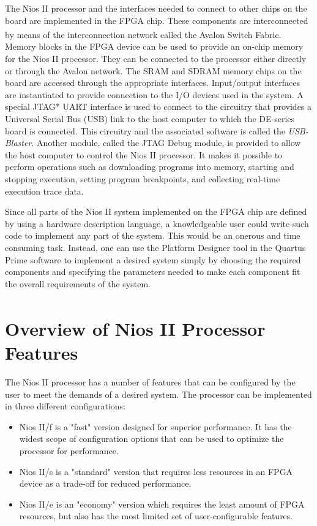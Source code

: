 \documentclass[11pt, twoside, pdftex]{article}
\begin{document}
\newpage
The Nios II processor and the interfaces needed to connect to other chips on the
board are implemented in the FPGA chip. These components are
interconnected by means of the interconnection network called the Avalon\textsuperscript{\textregistered} Switch Fabric.
Memory blocks in the FPGA device can be used to provide an on-chip memory
for the Nios II processor. They can be connected to the processor either directly or
through the Avalon network. The SRAM and SDRAM memory chips on the board
are accessed through the appropriate interfaces. Input/output interfaces are
instantiated to provide connection to the I/O devices used in the system. 
A special JTAG* UART interface is used to connect to the circuitry that provides a 
Universal Serial Bus (USB) link to the host computer to which the DE-series board is connected. 
This circuitry and the associated software is called the {\it USB-Blaster}. 
Another module, called the JTAG Debug module, is provided to allow the host computer 
to control the Nios II processor.
It makes it possible to perform operations such as downloading programs into memory,
starting and stopping execution, setting program breakpoints, and collecting real-time
execution trace data.

Since all parts of the Nios II system implemented on the FPGA chip are defined by
using a hardware description language, a knowledgeable user could write such code
to implement any part of the system. This would be an onerous and time consuming
task. Instead, one can use the Platform Designer tool in the Quartus Prime software
to implement a desired system simply by
choosing the required components and specifying the parameters needed to make
each component fit the overall requirements of the system.

\section{Overview of Nios\textsuperscript{\textregistered} II Processor Features}
The Nios II processor has a number of features that can be configured
by the user to meet the demands of a desired system. The processor can be implemented
in three different configurations:
\begin{itemize}
\item Nios II/f is a "fast" version designed for superior performance.
It has the widest scope of configuration options that can be used to optimize
the processor for performance.
\item Nios II/s is a "standard" version that requires less resources in an FPGA
device as a trade-off for reduced performance.
\item Nios II/e is an "economy" version which requires the least amount of FPGA
resources, but also has the most limited set of user-configurable features.
\end{itemize}
 
\end{document}

